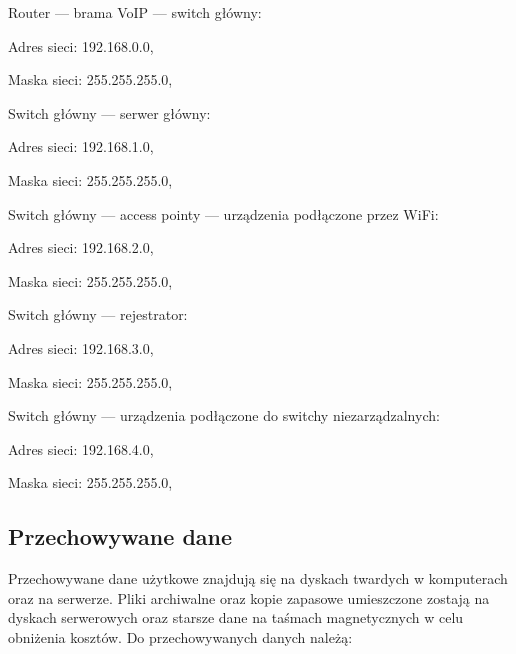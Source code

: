 \hspace{-0.5cm}\begin{minipage}{13.5cm}
\begin{itemize*}
	\item Router --- brama VoIP --- switch główny:
	\begin{itemize*}
		\item Adres sieci: 192.168.0.0,
		\item Maska sieci: 255.255.255.0,
	\end{itemize*}
	\item Switch główny --- serwer główny:
	\begin{itemize*}
		\item Adres sieci: 192.168.1.0,
		\item Maska sieci: 255.255.255.0,
	\end{itemize*}
	\item Switch główny --- access pointy --- urządzenia podłączone przez WiFi:
	\begin{itemize*}
		\item Adres sieci: 192.168.2.0,
		\item Maska sieci: 255.255.255.0,
	\end{itemize*}
	\item Switch główny --- rejestrator:
	\begin{itemize*}
		\item Adres sieci: 192.168.3.0,
		\item Maska sieci: 255.255.255.0,
	\end{itemize*}
	\item Switch główny --- urządzenia podłączone do switchy niezarządzalnych:
	\begin{itemize*}
		\item Adres sieci: 192.168.4.0,
		\item Maska sieci: 255.255.255.0,
	\end{itemize*}
\end{itemize*}
\end{minipage}

\newpage
\subsection{Przechowywane dane}
Przechowywane dane użytkowe znajdują się na dyskach twardych \linebreak w komputerach oraz na serwerze. Pliki archiwalne oraz kopie zapasowe umieszczone zostają na dyskach serwerowych oraz starsze dane na taśmach magnetycznych w celu obniżenia kosztów. Do przechowywanych danych \linebreak należą:

